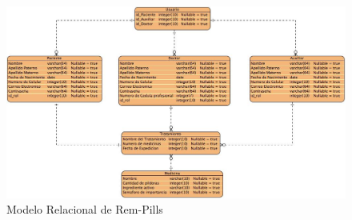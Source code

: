 \begin{figure}[htb]
	\centering
	\includegraphics[width=1.1\textwidth]{images/cap2/modelorelacional}
	\caption{Modelo Relacional de Rem-Pills} \label{fig:modelorelacional}
\end{figure} 




